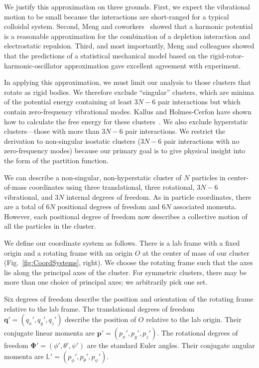 \documentclass[pre, aps, twocolumn, reprint, amsmath,amssymb, showpacs,
superscriptaddress] {revtex4-1}
\begin{document}
We justify this approximation on three grounds. First, we expect the
vibrational motion to be small because the interactions are short-ranged
for a typical colloidal system. Second, Meng and coworkers~\cite{meng10,
  meng_elastic_2014} showed that a harmonic potential is a reasonable
approximation for the combination of a depletion interaction and
electrostatic repulsion. Third, and most importantly, Meng and
colleagues showed that the predictions of a statistical mechanical model
based on the rigid-rotor-harmonic-oscillator approximation gave
excellent agreement with experiment.

In applying this approximation, we must limit our analysis to those
clusters that rotate as rigid bodies. We therefore exclude ``singular''
clusters, which are minima of the potential energy containing at least
$3N-6$ pair interactions but which contain zero-frequency vibrational
modes. Kallus and Holmes-Cerfon have shown how to calculate the free
energy for these clusters~\cite{kallus_free_2017}. We also exclude
hyperstatic clusters---those with more than $3N-6$ pair interactions. We
restrict the derivation to non-singular isostatic clusters ($3N-6$ pair
interactions with no zero-frequency modes) because our primary goal is
to give physical insight into the form of the partition function.

We can describe a non-singular, non-hyperstatic cluster of $N$ particles
in center-of-mass coordinates using three translational, three
rotational, $3N-6$ vibrational, and $3N$ internal degrees of freedom. As
in particle coordinates, there are a total of $6N$ positional degrees of
freedom and $6N$ associated momenta. However, each positional degree of
freedom now describes a collective motion of all the particles in the
cluster.

We define our coordinate system as follows. There is a lab frame with a
fixed origin and a rotating frame with an origin $O$ at the center of
mass of our cluster (Fig.~\ref{fig:CoordSystems}, right). We choose the
rotating frame such that the axes lie along the principal axes of the
cluster. For symmetric clusters, there may be more than one choice of
principal axes; we arbitrarily pick one set.

Six degrees of freedom describe the position and orientation of the
rotating frame relative to the lab frame. The translational degrees of
freedom $\mathbf{q}' = (q_x', q_y', q_z')$ describe the position of
$O$ relative to the lab origin. Their conjugate linear momenta are
$\mathbf{p}'=(p_x', p_y', p_z')$. The rotational degrees of freedom
$\bm{\Phi}'=(\phi', \theta', \psi')$ are the standard Euler angles.
Their conjugate angular momenta are $\mathbb{L}'= (p_\phi', p_\theta',
p_\psi')$.
\end{document}
